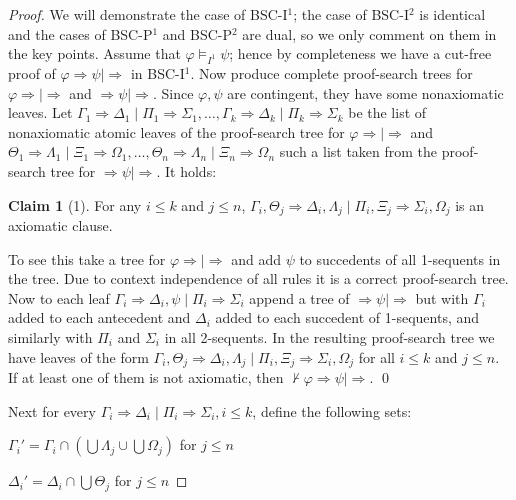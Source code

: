 \documentclass[11pt,a4paper,titlepage]{article}
\theoremstyle{definition}
\newtheorem{claim}{Claim}[section]
\newcommand{\3}{\vspace{.3in}}
\newcommand{\2}{\vspace{.2in}}
\newcommand{\1}{\vspace{.1in}}
\newcommand{\5}{\vspace{.05in}}
\begin{document}
 \begin{proof}
 	We will demonstrate the case of BSC-I$^1$; the case of BSC-I$^2$ is identical and the cases of BSC-P$^1$ and BSC-P$^2$ are dual, so we only comment on them in the key points. Assume that $\varphi\models_{I^1}\psi$; hence by completeness we have a cut-free proof of $\varphi\Rightarrow\psi\mid\Rightarrow$ in BSC-I$^1$. Now produce complete proof-search trees for
$\varphi\Rightarrow\mid\Rightarrow$ and $\Rightarrow\psi\mid\Rightarrow$. Since $\varphi, \psi$ are contingent, they have some nonaxiomatic leaves. Let $\Gamma_1\Rightarrow\Delta_1\mid\Pi_1\Rightarrow\Sigma_1, \ldots, \Gamma_k\Rightarrow\Delta_k\mid\Pi_k\Rightarrow\Sigma_k$ be the list
of nonaxiomatic atomic leaves of the proof-search tree for $\varphi\Rightarrow\mid\Rightarrow$ and $\Theta_1\Rightarrow\Lambda_1\mid\Xi_1\Rightarrow\Omega_1, \ldots, \Theta_n\Rightarrow\Lambda_n\mid\Xi_n\Rightarrow\Omega_n$ such a list
taken from the proof-search tree for $\Rightarrow\psi\mid\Rightarrow$. It holds: 

\begin{claim}[1]
	For any $i\leq k$ and $j\leq n$, $\Gamma_i, \Theta_j\Rightarrow\Delta_i, \Lambda_j\mid\Pi_i, \Xi_j\Rightarrow\Sigma_i, \Omega_j$ is an axiomatic clause.
\end{claim}

To see this take a tree for $\varphi\Rightarrow\mid\Rightarrow$ and add $\psi$ to succedents of all 1-sequents in the tree. Due to context independence of all rules
it is a correct proof-search tree. Now to each leaf $\Gamma_i\Rightarrow\Delta_i, \psi\mid\Pi_i\Rightarrow\Sigma_i$ append a tree of $\Rightarrow\psi\mid\Rightarrow$ but with $\Gamma_i$ added to each antecedent
and $\Delta_i$ added to each succedent of 1-sequents, and similarly with $\Pi_i$ and $\Sigma_i$ in all 2-sequents. In the resulting proof-search tree we have leaves of the form $\Gamma_i, \Theta_j\Rightarrow\Delta_i, \Lambda_j\mid\Pi_i, \Xi_j\Rightarrow\Sigma_i, \Omega_j$
for all $i\leq k$ and $j\leq n$. If at least one of them is not axiomatic, then $\nvdash \varphi\Rightarrow\psi\mid\Rightarrow$. \qed

\1

Next for every $\Gamma_i\Rightarrow\Delta_i\mid\Pi_i\Rightarrow\Sigma_i, i\leq k$, define the following sets:

\1

$\Gamma_i' = \Gamma_i\cap (\bigcup\Lambda_j\cup\bigcup\Omega_j)$ for $j\leq n$

$\Delta_i' = \Delta_i\cap\bigcup\Theta_j$ for $j\leq n$ 



\end{proof}
\end{document}
